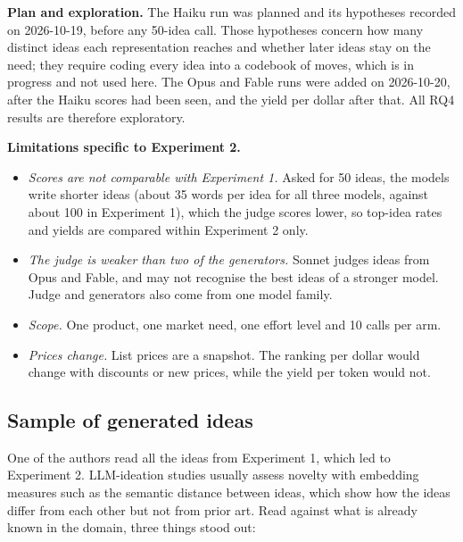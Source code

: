 \textbf{Plan and exploration.} The Haiku run was planned and its hypotheses recorded on 2026-10-19, before any 50-idea call. Those hypotheses concern how many distinct ideas each representation reaches and whether later ideas stay on the need; they require coding every idea into a codebook of moves, which is in progress and not used here. The Opus and Fable runs were added on 2026-10-20, after the Haiku scores had been seen, and the yield per dollar after that. All RQ4 results are therefore exploratory.

\textbf{Limitations specific to Experiment 2.}
\begin{itemize}
\tightlist
\item
  \emph{Scores are not comparable with Experiment 1.} Asked for 50 ideas, the models write shorter ideas (about 35 words per idea for all three models, against about 100 in Experiment 1), which the judge scores lower, so top-idea rates and yields are compared within Experiment 2 only.
\item
  \emph{The judge is weaker than two of the generators.} Sonnet judges ideas from Opus and Fable, and may not recognise the best ideas of a stronger model. Judge and generators also come from one model family.
\item
  \emph{Scope.} One product, one market need, one effort level and 10 calls per arm.
\item
  \emph{Prices change.} List prices are a snapshot. The ranking per dollar would change with discounts or new prices, while the yield per token would not.
\end{itemize}




\hypertarget{sample of genrated ideas}{%
\subsection{Sample of generated ideas}\label{sample of genrated ideas}}

One of the authors read all the ideas from Experiment 1, which led to Experiment 2. LLM-ideation studies usually assess novelty with embedding measures such as the semantic distance between ideas, which show how the ideas differ from each other but not from prior art. Read against what is already known in the domain, three things stood out:

